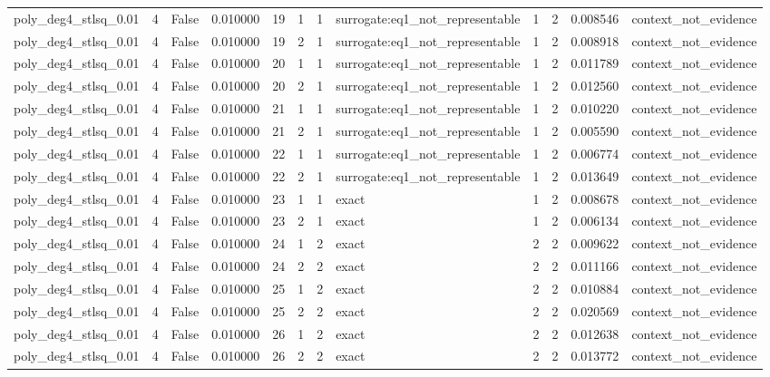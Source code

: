 \begin{tabular}{lrrrrrrlrrrl}
poly\_deg4\_stlsq\_0.01 & 4 & False & 0.010000 & 19 & 1 & 1 & surrogate:eq1\_not\_representable & 1 & 2 & 0.008546 & context\_not\_evidence \\
poly\_deg4\_stlsq\_0.01 & 4 & False & 0.010000 & 19 & 2 & 1 & surrogate:eq1\_not\_representable & 1 & 2 & 0.008918 & context\_not\_evidence \\
poly\_deg4\_stlsq\_0.01 & 4 & False & 0.010000 & 20 & 1 & 1 & surrogate:eq1\_not\_representable & 1 & 2 & 0.011789 & context\_not\_evidence \\
poly\_deg4\_stlsq\_0.01 & 4 & False & 0.010000 & 20 & 2 & 1 & surrogate:eq1\_not\_representable & 1 & 2 & 0.012560 & context\_not\_evidence \\
poly\_deg4\_stlsq\_0.01 & 4 & False & 0.010000 & 21 & 1 & 1 & surrogate:eq1\_not\_representable & 1 & 2 & 0.010220 & context\_not\_evidence \\
poly\_deg4\_stlsq\_0.01 & 4 & False & 0.010000 & 21 & 2 & 1 & surrogate:eq1\_not\_representable & 1 & 2 & 0.005590 & context\_not\_evidence \\
poly\_deg4\_stlsq\_0.01 & 4 & False & 0.010000 & 22 & 1 & 1 & surrogate:eq1\_not\_representable & 1 & 2 & 0.006774 & context\_not\_evidence \\
poly\_deg4\_stlsq\_0.01 & 4 & False & 0.010000 & 22 & 2 & 1 & surrogate:eq1\_not\_representable & 1 & 2 & 0.013649 & context\_not\_evidence \\
poly\_deg4\_stlsq\_0.01 & 4 & False & 0.010000 & 23 & 1 & 1 & exact & 1 & 2 & 0.008678 & context\_not\_evidence \\
poly\_deg4\_stlsq\_0.01 & 4 & False & 0.010000 & 23 & 2 & 1 & exact & 1 & 2 & 0.006134 & context\_not\_evidence \\
poly\_deg4\_stlsq\_0.01 & 4 & False & 0.010000 & 24 & 1 & 2 & exact & 2 & 2 & 0.009622 & context\_not\_evidence \\
poly\_deg4\_stlsq\_0.01 & 4 & False & 0.010000 & 24 & 2 & 2 & exact & 2 & 2 & 0.011166 & context\_not\_evidence \\
poly\_deg4\_stlsq\_0.01 & 4 & False & 0.010000 & 25 & 1 & 2 & exact & 2 & 2 & 0.010884 & context\_not\_evidence \\
poly\_deg4\_stlsq\_0.01 & 4 & False & 0.010000 & 25 & 2 & 2 & exact & 2 & 2 & 0.020569 & context\_not\_evidence \\
poly\_deg4\_stlsq\_0.01 & 4 & False & 0.010000 & 26 & 1 & 2 & exact & 2 & 2 & 0.012638 & context\_not\_evidence \\
poly\_deg4\_stlsq\_0.01 & 4 & False & 0.010000 & 26 & 2 & 2 & exact & 2 & 2 & 0.013772 & context\_not\_evidence \\

\end{tabular}

